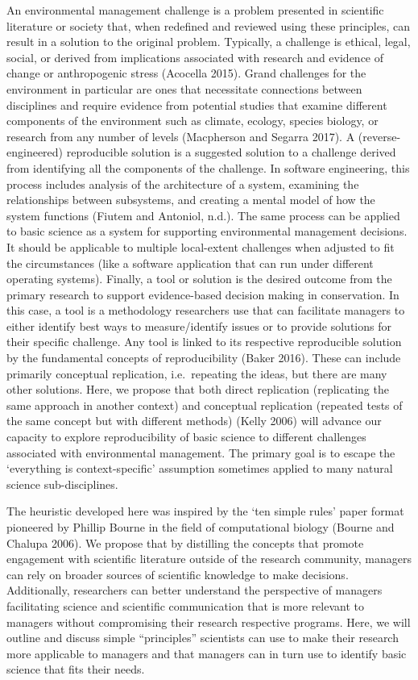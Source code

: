 \documentclass[fleqn,10pt]{wlpeerj} %
\begin{document}
An environmental management challenge is a problem presented in
scientific literature or society that, when redefined and reviewed using
these principles, can result in a solution to the original problem.
Typically, a challenge is ethical, legal, social, or derived from
implications associated with research and evidence of change or
anthropogenic stress (Acocella 2015). Grand challenges for the
environment in particular are ones that necessitate connections between
disciplines and require evidence from potential studies that examine
different components of the environment such as climate, ecology,
species biology, or research from any number of levels (Macpherson and
Segarra 2017). A (reverse-engineered) reproducible solution is a
suggested solution to a challenge derived from identifying all the
components of the challenge. In software engineering, this process
includes analysis of the architecture of a system, examining the
relationships between subsystems, and creating a mental model of how the
system functions (Fiutem and Antoniol, n.d.). The same process can be
applied to basic science as a system for supporting environmental
management decisions. It should be applicable to multiple local-extent
challenges when adjusted to fit the circumstances (like a software
application that can run under different operating systems). Finally, a
tool or solution is the desired outcome from the primary research to
support evidence-based decision making in conservation. In this case, a
tool is a methodology researchers use that can facilitate managers to
either identify best ways to measure/identify issues or to provide
solutions for their specific challenge. Any tool is linked to its
respective reproducible solution by the fundamental concepts of
reproducibility (Baker 2016). These can include primarily conceptual
replication, i.e.~repeating the ideas, but there are many other
solutions. Here, we propose that both direct replication (replicating
the same approach in another context) and conceptual replication
(repeated tests of the same concept but with different methods) (Kelly
2006) will advance our capacity to explore reproducibility of basic
science to different challenges associated with environmental
management. The primary goal is to escape the `everything is
context-specific' assumption sometimes applied to many natural science
sub-disciplines.

The heuristic developed here was inspired by the `ten simple rules'
paper format pioneered by Phillip Bourne in the field of computational
biology (Bourne and Chalupa 2006). We propose that by distilling the
concepts that promote engagement with scientific literature outside of
the research community, managers can rely on broader sources of
scientific knowledge to make decisions. Additionally, researchers can
better understand the perspective of managers facilitating science and
scientific communication that is more relevant to managers without
compromising their research respective programs. Here, we will outline
and discuss simple ``principles'' scientists can use to make their
research more applicable to managers and that managers can in turn use
to identify basic science that fits their needs.
\end{document}
